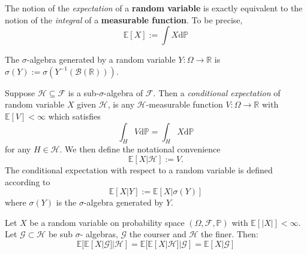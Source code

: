 \begin{definition}[Expectation]
    The notion of the \emph{expectation} of a \textbf{random variable} is exactly equivalent
    to the notion of the \emph{integral} of a \textbf{measurable function}.
    To be precise,
    \begin{equation}
        \mathbb{E}[X]:=\int X\mathrm d\mathbb{P}
    \end{equation}
\end{definition}

\begin{definition}
    The $\sigma$-algebra generated by a random variable $Y:\Omega\rightarrow\mathbb{R}$
    is $\sigma(Y):=\sigma(Y^{-1}(\mathcal{B}(\mathbb{R})))$.
\end{definition}

\begin{definition}
    Suppose $\mathcal{H}\subseteq\mathcal{F}$ is a sub-$\sigma$-algebra
    of $\mathcal{F}.$ Then a \emph{conditional expectation} of random variable
    $X$ given $\mathcal{H}$, is any $\mathcal{H}$-measurable function 
    $V:\Omega\rightarrow\mathbb{R}$ with $\mathbb{E}[V]<\infty$ which satisfies
    \begin{equation}
        \int_H V\mathrm d\mathbb{P}=\int_H X\mathrm d\mathbb{P}
    \end{equation}
    for any $H\in\mathcal{H}$. We then define the notational convenience
    \begin{equation}
        \mathbb{E}[X|\mathcal{H}]:=V.
    \end{equation}
    The conditional expectation with respect to a random variable is defined according
    to
    \begin{equation}
        \mathbb{E}[X|Y]:=\mathbb{E}[X|\sigma(Y)]
    \end{equation}
    where $\sigma(Y)$ is the $\sigma$-algebra generated by $Y$.
\end{definition}

\begin{theorem}
    Let $X$ be a random variable on probability space $(\Omega,\mathcal{F},\mathbb{P})$
    with $\mathbb{E}[|X|]<\infty$. Let $\mathcal{G}\subset\mathcal{H}$ be sub $\sigma$-
    algebras, $\mathcal{G}$ the courser and $\mathcal{H}$ the finer. Then:
    \begin{equation}
        \mathbb{E}[\mathbb{E}[X|\mathcal{G}]|\mathcal{H}]=\mathbb{E}[\mathbb{E}[X|\mathcal{H}]|\mathcal{G}]=\mathbb{E}[X|\mathcal{G}]
    \end{equation}
\end{theorem}

